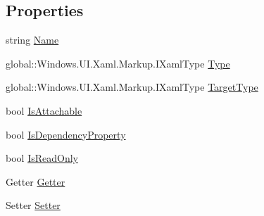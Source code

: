 \subsection*{Properties}
\begin{DoxyCompactItemize}
\item 
string \hyperlink{class_eli_log_in_app_1_1_eli_log_in_app___xaml_type_info_1_1_xaml_member_ac1f013d2990642b6f852b810aba7cc51}{Name}
\item 
global\+::\+Windows.\+U\+I.\+Xaml.\+Markup.\+I\+Xaml\+Type \hyperlink{class_eli_log_in_app_1_1_eli_log_in_app___xaml_type_info_1_1_xaml_member_a26483e8b7bc974da19930fbb3cfc4a23}{Type}
\item 
global\+::\+Windows.\+U\+I.\+Xaml.\+Markup.\+I\+Xaml\+Type \hyperlink{class_eli_log_in_app_1_1_eli_log_in_app___xaml_type_info_1_1_xaml_member_a85b99f47f9c752bb81d3df45ef549c8d}{Target\+Type}
\item 
bool \hyperlink{class_eli_log_in_app_1_1_eli_log_in_app___xaml_type_info_1_1_xaml_member_aa5f3e538f0fc1a54128a777e821743a4}{Is\+Attachable}
\item 
bool \hyperlink{class_eli_log_in_app_1_1_eli_log_in_app___xaml_type_info_1_1_xaml_member_a1f88b70290e95bf14f69c05a731200fb}{Is\+Dependency\+Property}
\item 
bool \hyperlink{class_eli_log_in_app_1_1_eli_log_in_app___xaml_type_info_1_1_xaml_member_a2c9b494d098ccde4ff5ff6cc56424a50}{Is\+Read\+Only}
\item 
Getter \hyperlink{class_eli_log_in_app_1_1_eli_log_in_app___xaml_type_info_1_1_xaml_member_a3c7eaaa6b9288b7cbe21637203008a62}{Getter}
\item 
Setter \hyperlink{class_eli_log_in_app_1_1_eli_log_in_app___xaml_type_info_1_1_xaml_member_af133a6c36339d121fe0b4c004e67979e}{Setter}
\end{DoxyCompactItemize}
